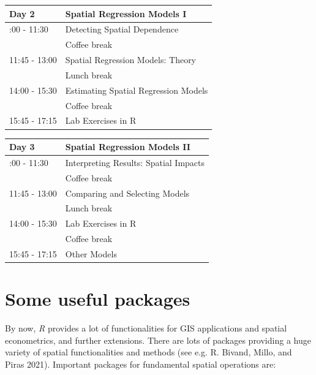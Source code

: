 \documentclass[
  letterpaper,
  DIV=11,
  numbers=noendperiod]{scrreprt}
\begin{document}
\begin{longtable}[]{@{}ll@{}}
\toprule\noalign{}
Day 2 & Spatial Regression Models I \\
\midrule\noalign{}
\endhead
\bottomrule\noalign{}
\endlastfoot
10:00 - 11:30 & Detecting Spatial Dependence \\
& Coffee break \\
11:45 - 13:00 & Spatial Regression Models: Theory \\
& Lunch break \\
14:00 - 15:30 & Estimating Spatial Regression Models \\
& Coffee break \\
15:45 - 17:15 & Lab Exercises in R \\
\end{longtable}

\begin{longtable}[]{@{}ll@{}}
\toprule\noalign{}
Day 3 & Spatial Regression Models II \\
\midrule\noalign{}
\endhead
\bottomrule\noalign{}
\endlastfoot
10:00 - 11:30 & Interpreting Results: Spatial Impacts \\
& Coffee break \\
11:45 - 13:00 & Comparing and Selecting Models \\
& Lunch break \\
14:00 - 15:30 & Lab Exercises in R \\
& Coffee break \\
15:45 - 17:15 & Other Models \\
\end{longtable}

\hypertarget{some-useful-packages}{%
\section*{Some useful packages}\label{some-useful-packages}}


By now, \emph{R} provides a lot of functionalities for GIS applications
and spatial econometrics, and further extensions. There are lots of
packages providing a huge variety of spatial functionalities and methods
(see e.g. R. Bivand, Millo, and Piras 2021). Important packages for
fundamental spatial operations are:
\end{document}
